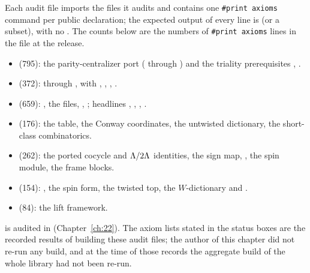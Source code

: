 Each audit file imports the files it audits and contains one \texttt{\#print axioms} command per public
declaration; the expected output of every line is  (or a
subset), with no .  The counts below are the numbers of \texttt{\#print axioms} lines in the
file at the release.
\begin{itemize}
\item {} (795): the parity-centralizer port
  ( through ) and the triality prerequisites
  , .
\item {} (372):  through
  , with , , , .
\item {} (659): ,
  the  files, , ; headlines
  , , , .
\item {} (176): the table, the Conway coordinates, the
  untwisted dictionary, the short-class combinatorics.
\item {} (262): the ported cocycle and
  ${\Lambda}/2{\Lambda}$ identities, the sign map, , the spin module, the frame blocks.
\item {} (154): , the spin form,
  the twisted top, the $W$-dictionary and .
\item {} (84): the lift framework.
\end{itemize}
 is audited in  (Chapter~\ref{ch:22}).
The axiom lists stated in the status boxes are the recorded results of building these audit files; the
author of this chapter did not re-run any build, and at the time of those records the aggregate build of
the whole library had not been re-run.


